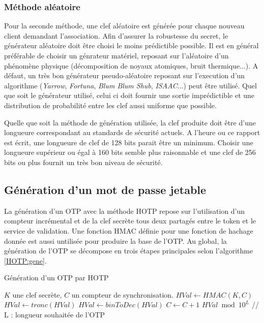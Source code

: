 \documentclass{../res/univ-projet}
\begin{document}
    \subsubsection{Méthode aléatoire}
    Pour la seconde méthode, une clef aléatoire est générée pour chaque nouveau client demandant l'association.
    Afin d'assurer la robustesse du secret, le générateur aléatoire doit \^etre choisi le moins prédictible possible. Il est en général préférable de choisir un génrateur 
    matériel, reposant sur l'aléatoire d'un phénomène physique (décomposition de noyaux atomiques, bruit thermique...). A défaut, un très bon générateur pseudo-aléatoire 
    reposant sur l'execution d'un algorithme (\emph{Yarrow}, \emph{Fortuna}, \emph{Blum Blum Shub}, \emph{ISAAC}...) peut \^etre utilisé. Quel que soit le générateur 
    utilisé, celui ci doit fournir une sortie imprédictible et une distribution de probabilité entre les clef aussi uniforme que possible.
  
  Quelle que soit la méthode de génération utilisée, la clef produite doit \^etre d'une longueure correspondant au standards de sécurité actuels. A l'heure ou ce rapport 
  est écrit, une longueure de clef de 128 bits parait \^etre un minimum. Choisir une longueure supérieur ou égal à 160 bits semble plus raisonnable et une clef de 256 
  bits ou plus fournit un très bon niveau de sécurité.
    
  \subsection{Génération d'un mot de passe jetable}
  La génération d'un OTP avec la méthode HOTP repose sur l'utilisation d'un compteur incrémental et de la clef secrète tous deux partagés entre le token et le service de 
  validation. Une fonction HMAC définie pour une fonction de hachage donnée est aussi untilisée pour produire la base de l'OTP.
  Au global, la génération de l'OTP se décompose en trois étapes principales selon l'algorithme \ref{HOTP:gene}.
  \begin{algorithm}
  \caption{Génération d'un OTP par HOTP}
    \label{HOTP:gene}
   
    \begin{algorithmic}
    \REQUIRE $K$ une clef secrète, $C$ un compteur de synchronisation.
    \STATE $HVal \leftarrow HMAC(K, C)$
    \STATE $HVal \leftarrow tronc(HVal)$
    \STATE $HVal \leftarrow binToDec(HVal)$
    \STATE $C \leftarrow C + 1$
    \newline
    \RETURN $HVal \bmod 10^L$ // L : longueur souhaitée de l'OTP
    \end{algorithmic}
  \end{algorithm}
  
\end{document}
